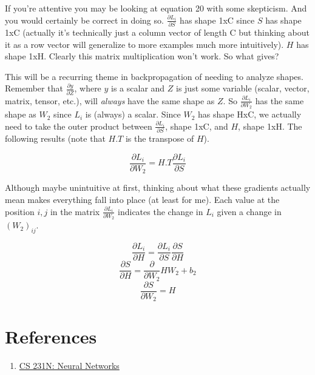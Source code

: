 \documentclass[12pt]{article}
\begin{document}
If you're attentive you may be looking at equation 20 with some skepticism. And you would certainly 
be correct in doing so. $\frac{\partial L_i}{\partial S}$ has shape 1xC since $S$ has shape 1xC
(actually it's technically just a column vector of length C but thinking about it as a row 
vector will generalize to more examples much more intuitively). $H$ has shape 1xH. Clearly this 
matrix multiplication won't work. So what gives?

This will be a recurring theme in backpropagation of needing to analyze shapes. Remember that 
$\frac{\partial y}{\partial Z}$, where $y$ is a scalar and $Z$ is just some variable 
(scalar,  vector, matrix, tensor, etc.), will \emph{always} have the same shape as $Z$. 
So $\frac{\partial L_i}{\partial W_2}$ has the same shape as $W_2$ since $L_i$ is (always) a scalar. 
Since $W_2$ has shape HxC, we actually need to take the outer product between $\frac{\partial L_i}{\partial S}$, 
shape 1xC, and $H$, shape 1xH. The following results (note that $H.T$ is the transpose of $H$).

\begin{equation}
    \frac{\partial L_i}{\partial W_2} =  H.T \frac{\partial L_i}{\partial S}
\end{equation}

Although maybe unintuitive at first, thinking about what these gradients actually mean makes 
everything fall into place (at least for me). Each value at the position $i, j$ in the matrix $\frac{\partial L_i}{\partial W_2}$
indicates the change in $L_i$ given a change in $(W_2)_{i j}$.



\begin{equation}
    \frac{\partial L_i}{\partial H} = \frac{\partial L_i}{\partial S} \frac{\partial S}{\partial H}
\end{equation}
\begin{equation}
    \frac{\partial S}{\partial H} = \frac{\partial }{\partial W_2} HW_2 + b_2
\end{equation}
\begin{equation}
    \frac{\partial S}{\partial W_2} = H
\end{equation}






\paragraph{}


\section{References}
\begin{enumerate}
    \item \href{https://cs231n.github.io/neural-networks-1/}{CS 231N: Neural Networks}
\end{enumerate}
\end{document}

